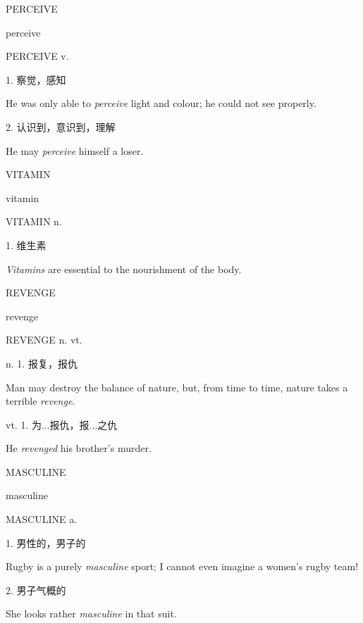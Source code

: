 \begin{flashcard}{
PERCEIVE

perceive
}
\begin{center}
PERCEIVE v. 
\end{center}
1. 察觉，感知

He was only able to \textit{perceive} light and colour; he could not see properly.

2. 认识到，意识到，理解

He may \textit{perceive} himself a loser.

\end{flashcard}
\begin{flashcard}{
VITAMIN

vitamin
}
\begin{center}
VITAMIN n. 
\end{center}
1. 维生素

\textit{Vitamins} are essential to the nourishment of the body.

\end{flashcard}
\begin{flashcard}{
REVENGE

revenge
}
\begin{center}
REVENGE n. vt. 
\end{center}
n. 1. 报复，报仇

Man may destroy the balance of nature, but, from time to time, nature takes a terrible \textit{revenge}.

vt. 1. 为...报仇，报...之仇

He \textit{revenged} his brother's murder.

\end{flashcard}
\begin{flashcard}{
MASCULINE

masculine
}
\begin{center}
MASCULINE a. 
\end{center}
1. 男性的，男子的

Rugby is a purely \textit{masculine} sport; I cannot even imagine a women's rugby team!

2. 男子气概的

She looks rather \textit{masculine} in that suit.

\end{flashcard}
